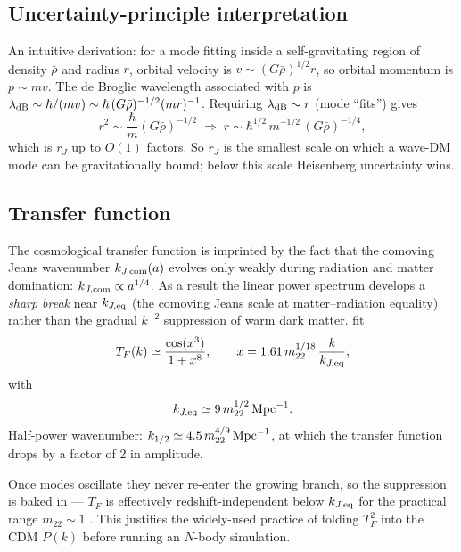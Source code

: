 \documentclass[12pt]{article}
\newcommand{\mtwtwo}{m_{22}}
\begin{document}
\subsection{Uncertainty-principle interpretation}

An intuitive derivation: for a mode fitting inside a self-gravitating
region of density $\bar\rho$ and radius $r$, orbital velocity is
$v\sim(G\bar\rho)^{1/2}r$, so orbital momentum is $p\sim mv$.  The
de Broglie wavelength associated with $p$ is
$\lambda_{\rm dB}\sim\hbar/(mv)\sim\hbar\,(G\bar\rho)^{-1/2}(mr)^{-1}$.
Requiring $\lambda_{\rm dB}\sim r$ (mode ``fits'') gives
%
\begin{equation}
  r^2 \sim \frac{\hbar}{m}(G\bar\rho)^{-1/2}
  \;\Longrightarrow\;
  r \sim \hbar^{1/2}\,m^{-1/2}\,(G\bar\rho)^{-1/4},
\end{equation}
%
which is $r_J$ up to $O(1)$ factors.  So $r_J$ is the smallest scale
on which a wave-DM mode can be gravitationally bound; below this
scale Heisenberg uncertainty wins.

\subsection{Transfer function}

The cosmological transfer function is imprinted by the fact that the
comoving Jeans wavenumber $k_{J,{\rm com}}(a)$ evolves only weakly
during radiation and matter domination:
$k_{J,{\rm com}}\propto a^{1/4}$.  As a result the linear power
spectrum develops a \emph{sharp break} near $k_{J,{\rm eq}}$ (the
comoving Jeans scale at matter--radiation equality) rather than the
gradual $k^{-2}$ suppression of warm dark matter.  \citet{Hu2000} fit
%
\begin{equation}
  T_F(k) \simeq \frac{\cos(x^3)}{1+x^8},
  \qquad
  x = 1.61\,\mtwtwo^{1/18}\,\frac{k}{k_{J,{\rm eq}}},
  \label{eq:hbg_TF}
\end{equation}
%
with
%
\begin{equation}
  k_{J,{\rm eq}} \simeq 9\,\mtwtwo^{1/2}\,{\rm Mpc}^{-1}.
\end{equation}
%
Half-power wavenumber:
$k_{1/2}\simeq 4.5\,\mtwtwo^{4/9}\,{\rm Mpc}^{-1}$, at which the
transfer function drops by a factor of 2 in amplitude.

Once modes oscillate they never re-enter the growing branch, so the
suppression is baked in --- $T_F$ is effectively redshift-independent
below $k_{J,{\rm eq}}$ for the practical range $\mtwtwo\sim 1$
\citep{Schive2014b}.  This justifies the widely-used practice of
folding $T_F^2$ into the CDM $P(k)$ before running an $N$-body
simulation.
\end{document}
